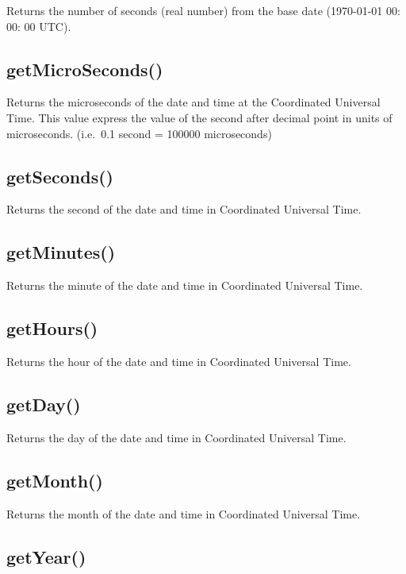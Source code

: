 \documentclass[
]{book}
\begin{document}
Returns the number of seconds (real number) from the base date (1970-01-01 00: 00: 00 UTC).

\hypertarget{getmicroseconds}{%
\subsection{getMicroSeconds()}\label{getmicroseconds}}

Returns the microseconds of the date and time at the Coordinated Universal Time. This value express the value of the second after decimal point in units of microseconds. (i.e.~0.1 second = 100000 microseconds)

\hypertarget{getseconds}{%
\subsection{getSeconds()}\label{getseconds}}

Returns the second of the date and time in Coordinated Universal Time.

\hypertarget{getminutes}{%
\subsection{getMinutes()}\label{getminutes}}

Returns the minute of the date and time in Coordinated Universal Time.

\hypertarget{gethours}{%
\subsection{getHours()}\label{gethours}}

Returns the hour of the date and time in Coordinated Universal Time.

\hypertarget{getday}{%
\subsection{getDay()}\label{getday}}

Returns the day of the date and time in Coordinated Universal Time.

\hypertarget{getmonth}{%
\subsection{getMonth()}\label{getmonth}}

Returns the month of the date and time in Coordinated Universal Time.

\hypertarget{getyear}{%
\subsection{getYear()}\label{getyear}}
\end{document}
